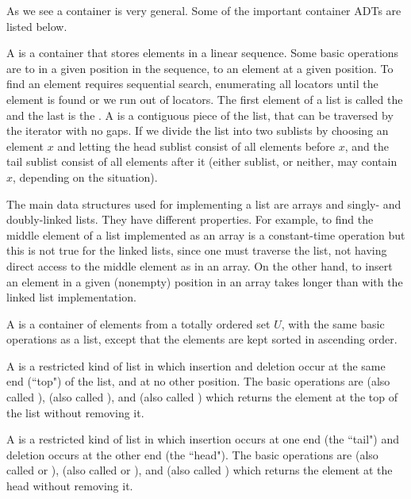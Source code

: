 As we see a container is very general. Some of the important container
ADTs are listed below.

A  is a container that stores elements in a linear
sequence. Some basic operations are to  in a given
position in the sequence, to  an element at a given
position. To find an element requires sequential search, enumerating
all locators until the element is found or we run out of locators. The first element 
of a list is called the  and the last is the .
A  is a contiguous piece of the list, that can be traversed by the 
iterator with no gaps. If we divide the list into two sublists by choosing an 
element $x$ and letting the head sublist consist of all elements before $x$, and the 
tail sublist consist of all elements after it (either sublist, or neither, may 
contain $x$, depending on the situation).

The main data structures used for implementing a list are arrays and
singly- and doubly-linked lists. They have different properties. For
example, to find the middle element of a list implemented as an array
is a constant-time operation but this is not true for the linked lists,
since one must traverse the list, not having direct access to the middle
element as in an array. On the other hand, to insert an element in a
given (nonempty) position in an array takes longer than with the linked
list implementation.

A  is a container of elements from a totally
ordered set $U$, with the same basic operations as a list, except that
the elements are kept sorted in ascending order.

A  is a restricted kind of list in which insertion and deletion
occur at the same end (``top") of the list, and at no other position. The
basic operations are  (also called ),
 (also called ), and 
(also called ) which returns the element at the top of the
list without removing it.

A  is a restricted kind of list in which insertion occurs at one end
(the ``tail") and deletion occurs at the other end (the ``head"). The
basic operations are  (also called  or 
),  (also called  or 
), and  (also called ) which 
returns the element at the head without removing it.

